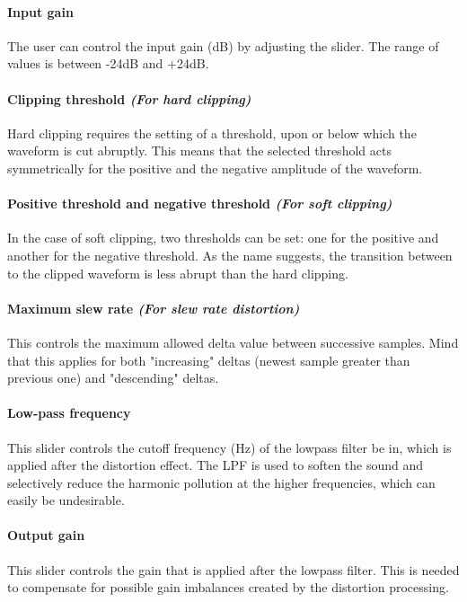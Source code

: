 \documentclass{article}
\begin{document}
\paragraph{Input gain} The user can control the input gain (dB) by adjusting the slider. The range of values is between -24dB and +24dB.
\paragraph{Clipping threshold \textit{(For hard clipping)}} Hard clipping requires the setting of a threshold, upon or below which the waveform is cut abruptly. This means that the selected threshold acts symmetrically for the positive and the negative amplitude of the waveform.
\paragraph{Positive threshold and negative threshold \textit{(For soft clipping)}} In the case of soft clipping, two thresholds can be set: one for the positive and another for the negative threshold. As the name suggests, the transition between to the clipped waveform is less abrupt than the hard clipping.
\paragraph{Maximum slew rate \textit{(For slew rate distortion)}}
This controls the maximum allowed delta value between successive samples. Mind that this applies for both "increasing" deltas (newest sample greater than previous one) and "descending" deltas.  
\paragraph{Low-pass frequency} This slider controls the cutoff frequency (Hz) of the lowpass filter be in, which is applied after the distortion effect. The LPF is used to soften the sound and selectively reduce the harmonic pollution at the higher frequencies, which can easily be undesirable.
\paragraph{Output gain} This slider controls the gain that is applied after the lowpass filter. This is needed to compensate for possible gain imbalances created by the distortion processing.



\end{document}

